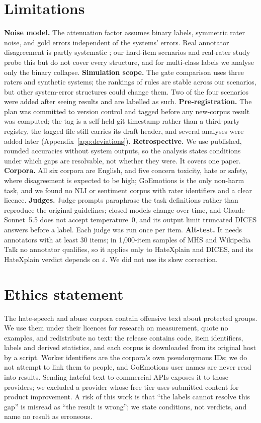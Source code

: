 \documentclass[11pt]{article}
\begin{document}
\section*{Limitations}
\textbf{Noise model.} The attenuation factor assumes binary labels, symmetric rater noise, and gold errors independent of the systems' errors. Real annotator disagreement is partly systematic \citep{davani2022dealing}; our hard-item scenarios and real-rater study probe this but do not cover every structure, and for multi-class labels we analyse only the binary collapse. \textbf{Simulation scope.} The gate comparison uses three raters and synthetic systems; the rankings of rules are stable across our scenarios, but other system-error structures could change them. Two of the four scenarios were added after seeing results and are labelled as such. \textbf{Pre-registration.} The plan was committed to version control and tagged before any new-corpus result was computed; the tag is a self-held git timestamp rather than a third-party registry, the tagged file still carries its draft header, and several analyses were added later (Appendix~\ref{app:deviations}). \textbf{Retrospective.} We use published, rounded accuracies without system outputs, so the analysis states conditions under which gaps are resolvable, not whether they were. It covers one paper. \textbf{Corpora.} All six corpora are English, and five concern toxicity, hate or safety, where disagreement is expected to be high; GoEmotions is the only non-harm task, and we found no NLI or sentiment corpus with rater identifiers and a clear licence. \textbf{Judges.} Judge prompts paraphrase the task definitions rather than reproduce the original guidelines; closed models change over time, and Claude Sonnet~5.5 does not accept temperature~0, and its output limit truncated \jSonnetDthreeUnparsed DICES answers before a label. Each judge was run once per item. \textbf{Alt-test.} It needs annotators with at least 30 items; in 1,000-item samples of MHS and Wikipedia Talk no annotator qualifies, so it applies only to HateXplain and DICES, and its HateXplain verdict depends on $\varepsilon$. We did not use its skew correction.

\section*{Ethics statement}
The hate-speech and abuse corpora contain offensive text about protected groups. We use them under their licences for research on measurement, quote no examples, and redistribute no text: the release contains code, item identifiers, labels and derived statistics, and each corpus is downloaded from its original host by a script. Worker identifiers are the corpora's own pseudonymous IDs; we do not attempt to link them to people, and GoEmotions user names are never read into results. Sending hateful text to commercial APIs exposes it to those providers; we excluded a provider whose free tier uses submitted content for product improvement. A risk of this work is that ``the labels cannot resolve this gap'' is misread as ``the result is wrong''; we state conditions, not verdicts, and name no result as erroneous.
\end{document}
